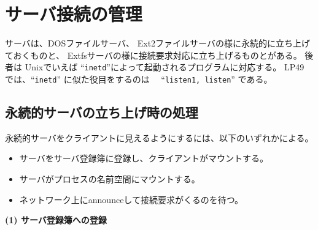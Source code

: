 \vspace{4cm}




\chapter{サーバ接続の管理}
サーバは、DOSファイルサーバ、 Ext2ファイルサーバの様に永続的に立ち上げておくものと、
Extfsサーバの様に接続要求対応に立ち上げるものとがある。
後者は Unixでいえば ``{\tt inetd}''によって起動されるプログラムに対応する。
LP49 では、``{\tt inetd}'' に似た役目をするのは 　``{\tt listen1, listen}'' である。


\section{永続的サーバの立ち上げ時の処理}

永続的サーバをクライアントに見えるようにするには、以下のいずれかによる。
\begin{itemize}
\item   サーバをサーバ登録簿に登録し、クライアントがマウントする。
\item   サーバがプロセスの名前空間にマウントする。
\item   ネットワーク上にannounceして接続要求がくるのを待つ。
\end{itemize}


{\bf\flushleft  (1) サーバ登録簿への登録}

